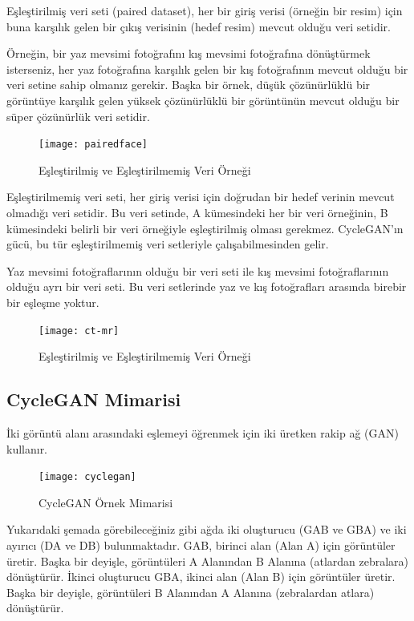 \documentclass[12pt, a4paper]{article}
\begin{document}
	Eşleştirilmiş veri seti (paired dataset), her bir giriş verisi (örneğin bir resim) için buna karşılık gelen bir çıkış verisinin (hedef resim) mevcut olduğu veri setidir.
	
	Örneğin, bir yaz mevsimi fotoğrafını kış mevsimi fotoğrafına dönüştürmek isterseniz, her yaz fotoğrafına karşılık gelen bir kış fotoğrafının mevcut olduğu bir veri setine sahip olmanız gerekir.
	Başka bir örnek, düşük çözünürlüklü bir görüntüye karşılık gelen yüksek çözünürlüklü bir görüntünün mevcut olduğu bir süper çözünürlük veri setidir.
	
	\begin{figure}[h]
		\centering
		\texttt{[image: pairedface]}
		\label{pairedface}
		\caption{Eşleştirilmiş\cite{Ganel_2021} ve Eşleştirilmemiş Veri Örneği}
	\end{figure}
	\FloatBarrier
	Eşleştirilmemiş veri seti, her giriş verisi için doğrudan bir hedef verinin mevcut olmadığı veri setidir. Bu veri setinde, A kümesindeki her bir veri örneğinin, B kümesindeki belirli bir veri örneğiyle eşleştirilmiş olması gerekmez. CycleGAN'ın gücü, bu tür eşleştirilmemiş veri setleriyle çalışabilmesinden gelir.
	
	Yaz mevsimi fotoğraflarının olduğu bir veri seti ile kış mevsimi fotoğraflarının olduğu ayrı bir veri seti. Bu veri setlerinde yaz ve kış fotoğrafları arasında birebir bir eşleşme yoktur.
	
	\begin{figure}[h]
		\centering
		\texttt{[image: ct-mr]}
		\label{mr-ct}
		\caption{Eşleştirilmiş ve Eşleştirilmemiş Veri Örneği\cite{Jin_2019}}
	\end{figure}
	\FloatBarrier

	\subsection{CycleGAN Mimarisi}
	İki görüntü alanı arasındaki eşlemeyi öğrenmek için iki üretken rakip ağ (GAN) kullanır. 
	
	\begin{figure}[h]
		\centering
		\texttt{[image: cyclegan]}
		\label{cyclegan}
		\caption{CycleGAN Örnek Mimarisi\cite{Introduction-2024-05-22}}
	\end{figure}
	\FloatBarrier
	\clearpage
	Yukarıdaki şemada görebileceğiniz gibi ağda iki oluşturucu (GAB ve GBA) ve iki ayırıcı (DA ve DB) bulunmaktadır. GAB, birinci alan (Alan A) için görüntüler üretir. Başka bir deyişle, görüntüleri A Alanından B Alanına (atlardan zebralara) dönüştürür. İkinci oluşturucu GBA, ikinci alan (Alan B) için görüntüler üretir. Başka bir deyişle, görüntüleri B Alanından A Alanına (zebralardan atlara) dönüştürür.
	
\end{document}
